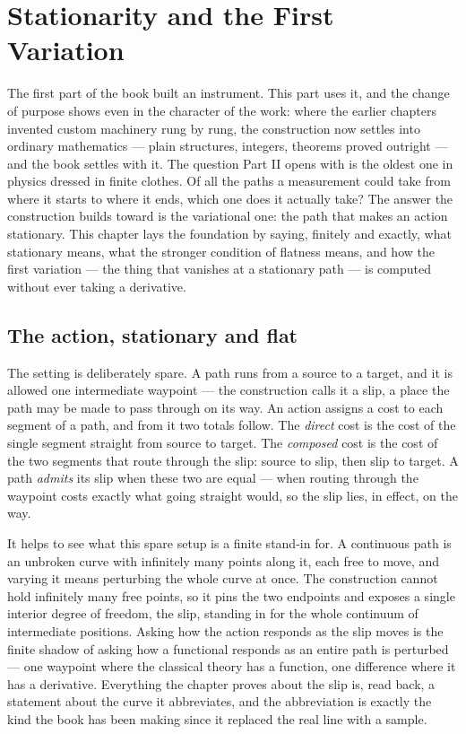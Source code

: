 \chapter{Stationarity and the First Variation}
\label{chap:stationarity-first-variation}

The first part of the book built an instrument. This part uses it, and the change of purpose shows
even in the character of the work: where the earlier chapters invented custom machinery rung by rung,
the construction now settles into ordinary mathematics --- plain structures, integers, theorems proved
outright --- and the book settles with it. The question Part II opens with is the oldest one in
physics dressed in finite clothes. Of all the paths a measurement could take from where it starts to
where it ends, which one does it actually take? The answer the construction builds toward is the
variational one: the path that makes an action stationary. This chapter lays the foundation by saying,
finitely and exactly, what stationary means, what the stronger condition of flatness means, and how
the first variation --- the thing that vanishes at a stationary path --- is computed without ever
taking a derivative.

\section{The action, stationary and flat}
\label{se:the-action-stationary-and-flat}

The setting is deliberately spare. A path runs from a source to a target, and it is allowed one
intermediate waypoint --- the construction calls it a slip, a place the path may be made to pass
through on its way. An action assigns a cost to each segment of a path, and from it two totals follow.
The \emph{direct} cost is the cost of the single segment straight from source to target. The
\emph{composed} cost is the cost of the two segments that route through the slip: source to slip, then
slip to target. A path \emph{admits} its slip when these two are equal --- when routing through the
waypoint costs exactly what going straight would, so the slip lies, in effect, on the way.

It helps to see what this spare setup is a finite stand-in for. A continuous path is an unbroken curve
with infinitely many points along it, each free to move, and varying it means perturbing the whole
curve at once. The construction cannot hold infinitely many free points, so it pins the two endpoints
and exposes a single interior degree of freedom, the slip, standing in for the whole continuum of
intermediate positions. Asking how the action responds as the slip moves is the finite shadow of
asking how a functional responds as an entire path is perturbed --- one waypoint where the classical
theory has a function, one difference where it has a derivative. Everything the chapter proves about
the slip is, read back, a statement about the curve it abbreviates, and the abbreviation is exactly the
kind the book has been making since it replaced the real line with a sample.

